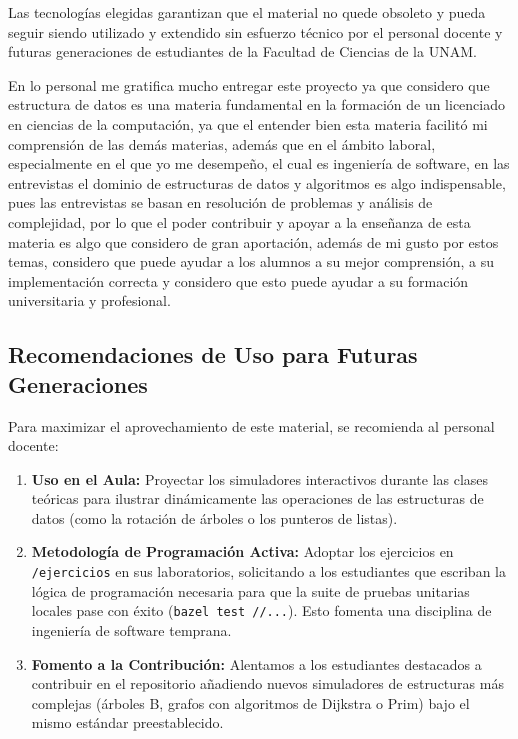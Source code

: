 \documentclass[12 pt]{article}
\begin{document}
Las tecnologías elegidas garantizan que el material no quede obsoleto y pueda seguir siendo utilizado y extendido sin esfuerzo técnico por el personal docente y futuras generaciones de estudiantes de la Facultad de Ciencias de la UNAM.

En lo personal me gratifica mucho entregar este proyecto ya que considero que estructura de datos es una materia fundamental en la formación de un licenciado en ciencias de la computación, ya que el entender bien esta materia facilitó mi comprensión de las demás materias, además que en el ámbito laboral, especialmente en el que yo me desempeño, el cual es ingeniería de software, en las entrevistas el dominio de estructuras de datos y algoritmos es algo indispensable, pues las entrevistas se basan en resolución de problemas y análisis de complejidad, por lo que el poder contribuir y apoyar a la enseñanza de esta materia es algo que considero de gran aportación, además de mi gusto por estos temas, considero que puede ayudar a los alumnos a su mejor comprensión, a su implementación correcta y considero que esto puede ayudar a su formación universitaria y profesional.

\subsection*{Recomendaciones de Uso para Futuras Generaciones}
Para maximizar el aprovechamiento de este material, se recomienda al personal docente:
\begin{enumerate}
    \item \textbf{Uso en el Aula:} Proyectar los simuladores interactivos durante las clases teóricas para ilustrar dinámicamente las operaciones de las estructuras de datos (como la rotación de árboles o los punteros de listas).
    \item \textbf{Metodología de Programación Activa:} Adoptar los ejercicios en \texttt{/ejercicios} en sus laboratorios, solicitando a los estudiantes que escriban la lógica de programación necesaria para que la suite de pruebas unitarias locales pase con éxito (\texttt{bazel test //...}). Esto fomenta una disciplina de ingeniería de software temprana.
    \item \textbf{Fomento a la Contribución:} Alentamos a los estudiantes destacados a contribuir en el repositorio añadiendo nuevos simuladores de estructuras más complejas (árboles B, grafos con algoritmos de Dijkstra o Prim) bajo el mismo estándar preestablecido.
\end{enumerate}
\end{document}
